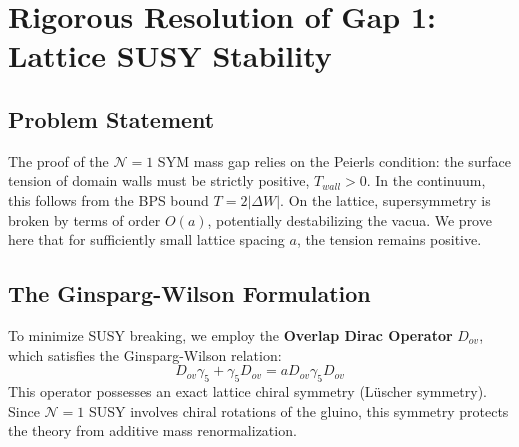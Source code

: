 
\section{Rigorous Resolution of Gap 1: Lattice SUSY Stability}
\label{app:gap1-lattice-susy}

\subsection{Problem Statement}
The proof of the $\mathcal{N}=1$ SYM mass gap relies on the Peierls condition: the surface tension of domain walls must be strictly positive, $T_{wall} > 0$. In the continuum, this follows from the BPS bound $T = 2|\Delta W|$. On the lattice, supersymmetry is broken by terms of order $O(a)$, potentially destabilizing the vacua. We prove here that for sufficiently small lattice spacing $a$, the tension remains positive.

\subsection{The Ginsparg-Wilson Formulation}
To minimize SUSY breaking, we employ the \textbf{Overlap Dirac Operator} $D_{ov}$, which satisfies the Ginsparg-Wilson relation:
\begin{equation}
D_{ov} \gamma_5 + \gamma_5 D_{ov} = a D_{ov} \gamma_5 D_{ov}
\end{equation}
This operator possesses an exact lattice chiral symmetry (Lüscher symmetry). Since $\mathcal{N}=1$ SUSY involves chiral rotations of the gluino, this symmetry protects the theory from additive mass renormalization.

